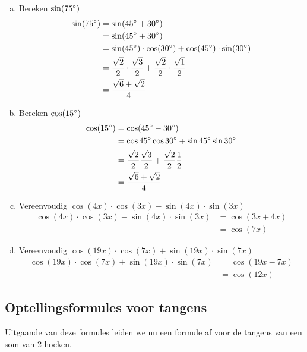 \documentclass[twoside,a4paper,12pt]{article}
\begin{document}
\begin{enumerate}[(a)]
  \item Bereken $\sin(75^\circ)$
  \vspace*{-0.2cm}
  \begin{align*}
    \sin(75^\circ)&=\sin(45^\circ+30^\circ)\\
                   &=\sin(45^\circ+30^\circ)\\
                   &=\sin(45^\circ)\cdot \cos(30^\circ)+\cos(45^\circ)\cdot \sin(30^\circ)\\
                   &=\frac{\sqrt{2}}{2}\cdot \frac{\sqrt{3}}{2}+\frac{\sqrt{2}}{2}\cdot\frac{\sqrt{1}}{2}\\
                   &=\frac{\sqrt{6}+\sqrt{2}}{4}
  \end{align*}
  \item Bereken $\cos(15^\circ)$
  \vspace*{-0.2cm}
  \begin{align*}
    \cos(15^\circ)&= \cos(45^\circ-30^\circ)\\
                   &= \cos 45^\circ \cos 30^\circ + \sin 45^\circ \sin 30^\circ\\
                   &= \dfrac{\sqrt{2}}{2}\dfrac{\sqrt{3}}{2} + \dfrac{\sqrt{2}}{2}\dfrac{1}{2}\\
                   &= \dfrac{\sqrt{6} +\sqrt{2}}{4}
  \end{align*}
  \item Vereenvoudig $\cos(4x)\cdot \cos(3x)-\sin(4x)\cdot \sin(3x)$
  \vspace*{-0.2cm}
  \begin{align*}
    \cos(4x)\cdot \cos(3x)-\sin(4x)\cdot \sin(3x)&=\cos(3x+4x)\\
                                                 &=\cos(7x)
  \end{align*}
  \item Vereenvoudig $\cos(19x)\cdot \cos(7x)+\sin(19x)\cdot \sin(7x)$
  \vspace*{-0.2cm}
  \begin{align*}
    \cos(19x)\cdot \cos(7x)+\sin(19x)\cdot \sin(7x)&=\cos(19x-7x)\\
                                                 &=\cos(12x)
  \end{align*}
\end{enumerate}

\subsection{Optellingsformules voor tangens}
Uitgaande van deze formules leiden we nu een formule af voor de tangens van een som van 2 hoeken.
\end{document}
